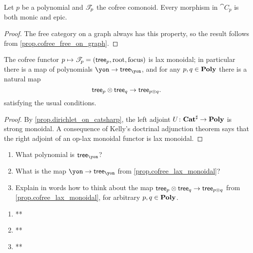 \documentclass[Book-Poly]{subfiles}
\begin{document}
\begin{corollary}
Let $p$ be a polynomial and $\mathscr{T}_{p}$ the cofree comonoid. Every morphism in $\cat{C}_p$ is both monic and epic.
\end{corollary}
\begin{proof}
The free category on a graph always has this property, so the result follows from \cref{prop.cofree_free_on_graph}.
\end{proof}

\begin{proposition}\label{prop.cofree_lax_monoidal}
The cofree functor $p\mapsto\mathscr{T}_{p}=(\mathsf{tree}_p,\mathrm{root},\mathrm{focus})$ is lax monoidal; in particular there is a map of polynomials $\yon\to\tr_\yon$, and for any $p,q\in\mathbf{Poly}$ there is a natural map
\[
	\mathsf{tree}_p\otimes\mathsf{tree}_q\to\mathsf{tree}_{p\otimes q}.
\]
satisfying the usual conditions.
\end{proposition}
\begin{proof}
By \cref{prop.dirichlet_on_catsharp}, the left adjoint $U\colon\mathbf{Cat}^\sharp\to\mathbf{Poly}$ is strong monoidal. A consequence of Kelly's doctrinal adjunction theorem \cite{kelly1974doctrinal} says that the right adjoint of an op-lax monoidal functor is lax monoidal.
\end{proof}

\begin{exercise}
\begin{enumerate}
	\item What polynomial is $\tr_\yon$?
	\item What is the map $\yon\to\tr_\yon$ from \cref{prop.cofree_lax_monoidal}?
	\item Explain in words how to think about the map $\mathsf{tree}_p\otimes\mathsf{tree}_q\to\mathsf{tree}_{p\otimes q}$ from \cref{prop.cofree_lax_monoidal}, for arbitrary $p,q\in\mathbf{Poly}$.
\qedhere
\end{enumerate}
\begin{solution}
\begin{enumerate}
    \item **
    \item **
    \item **
\end{enumerate}
\end{solution}
\end{exercise}
\end{document}
